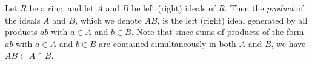 \documentclass{article}
\begin{document}
Let $R$ be a ring, and let $A$ and $B$ be left (right) ideals of $R$.  Then the {\it product} of the ideals $A$ and $B$, which we denote $AB$, is the left (right) ideal generated by all products $ab$ with $a\in A$ and $b\in B$.  Note that since sums of products of the form $ab$ with $a\in A$ and $b\in B$ are contained simultaneously in both $A$ and $B$, we have $AB\subset A\cap B$.
\end{document}
